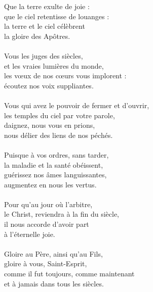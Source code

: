 Que la terre exulte de joie :\\
que le ciel retentisse de louanges :\\
la terre et le ciel célèbrent\\
la gloire des Apôtres.\\
\\
Vous les juges des siècles,\\
et les vraies lumières du monde,\\
les vœux de nos cœurs vous implorent :\\
écoutez nos voix suppliantes.\\
\\
Vous qui avez le pouvoir de fermer et d’ouvrir,\\
les temples du ciel par votre parole,\\
daignez, nous vous en prions,\\
nous délier des liens de nos péchés.\\
\\
Puisque à vos ordres, sans tarder,\\
la maladie et la santé obéissent,\\
guérissez nos âmes languissantes,\\
augmentez en nous les vertus.\\
\\
Pour qu’au jour où l’arbitre,\\
le Christ, reviendra à la fin du siècle,\\
il nous accorde d’avoir part\\
à l’éternelle joie.\\
\\
Gloire au Père, ainsi qu’au Fils,\\
gloire à vous, Saint-Esprit,\\
comme il fut toujours, comme maintenant\\
et à jamais dans tous les siècles.